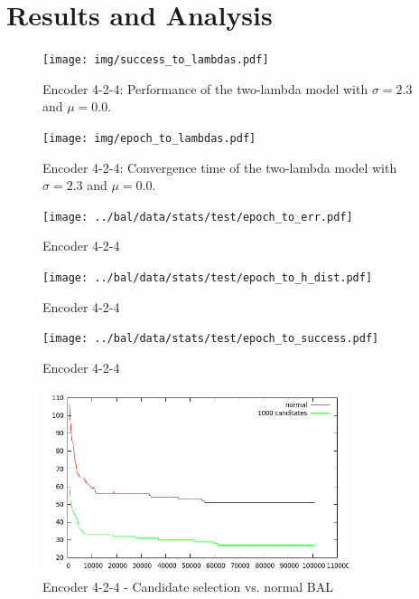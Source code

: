 
\section{Results and Analysis} 

\begin{figure}[t]
  \centering
  \texttt{[image: img/success\_to\_lambdas.pdf]}    
  \caption{Encoder 4-2-4: Performance of the two-lambda model with $\sigma = 2.3$ and $\mu = 0.0$.}
  \label{fig:424-success_to_lambdas}
\end{figure}
\begin{figure}[t]
  \centering
  \texttt{[image: img/epoch\_to\_lambdas.pdf]}    
  \caption{Encoder 4-2-4: Convergence time of the two-lambda model with $\sigma = 2.3$ and $\mu = 0.0$.}
  \label{fig:424-epoch_to_lambdas}
\end{figure}

\begin{figure}[t]
  \centering
  \texttt{[image: ../bal/data/stats/test/epoch\_to\_err.pdf]}    
  \caption{Encoder 4-2-4}
  \label{fig:424-test1}
\end{figure}


\begin{figure}[t]
  \centering
  \texttt{[image: ../bal/data/stats/test/epoch\_to\_h\_dist.pdf]}    
  \caption{Encoder 4-2-4}
  \label{fig:424-test2-1}
\end{figure}

\begin{figure}[t]
  \centering
  \texttt{[image: ../bal/data/stats/test/epoch\_to\_success.pdf]}    
  \caption{Encoder 4-2-4}
  \label{fig:424-test2-2}
\end{figure}

\begin{figure}[t]
  \centering
  \includegraphics[width=0.8\textwidth]{../presentation/img/long_run_error.png}    
  \caption{Encoder 4-2-4 - Candidate selection vs. normal BAL}
  \label{fig:424-test2-3}
\end{figure}

